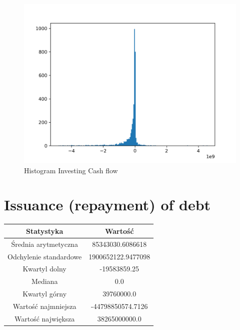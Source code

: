 \documentclass{article}
\begin{document}
\begin{figure}[h!]
    \includegraphics[width=\linewidth]{variables/Investing Cash flow.png}
    \caption{Histogram Investing Cash flow }
\end{figure}\section{ Issuance (repayment) of debt }

\begin{center}
    \begin{tabular}{|c | c|} 
    \hline
    Statystyka & Wartość \\
    \hline\hline
    Średnia arytmetyczna & 85343030.6086618 \\ 
    \hline
    Odchylenie standardowe & 1900652122.9477098 \\
    \hline
    Kwartyl dolny & -19583859.25 \\
    \hline
    Mediana & 0.0 \\
    \hline
    Kwartyl górny & 39760000.0 \\
    \hline
    Wartość najmniejsza & -44798850574.7126 \\
    \hline
    Wartość największa & 38265000000.0 \\
    \hline
   \end{tabular}
\end{center}
\end{document}
